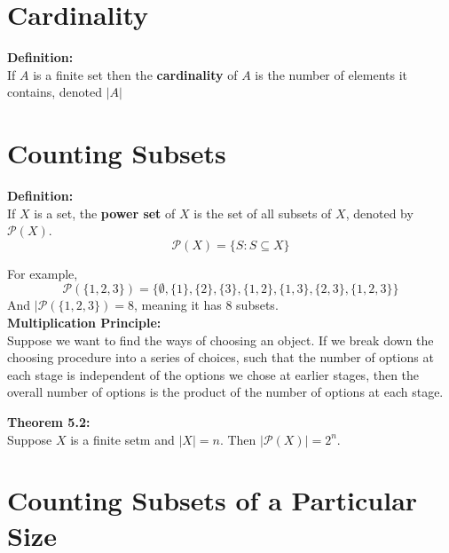 \documentclass{report}
\newenvironment{frameblue}[1][BlueViolet]
  {\begin{tcolorbox}[colframe=#1,colback=white]}
  {\end{tcolorbox}}
\newenvironment{framered}[1][Maroon]
  {\begin{tcolorbox}[colframe=#1,colback=white]}
  {\end{tcolorbox}}
\begin{document}
\section{Cardinality}

\begin{frameblue}
    \textbf{Definition:}\\
    If $A$ is a finite set then the \textbf{cardinality} of $A$ is the number of elements it contains, denoted $|A|$
\end{frameblue}

\section{Counting Subsets}

\begin{frameblue}
    \textbf{Definition:}\\
    If $X$ is a set, the \textbf{power set} of $X$ is the set of all subsets of $X$, denoted by $\mathcal{P}(X)$.
    \begin{equation*}
        \mathcal{P}(X) = \{ S : S \subseteq X \}
    \end{equation*}
\end{frameblue}

For example,
\begin{equation}
    \mathcal{P}(\{ 1,2,3\} ) = \{ \emptyset, \{ 1 \}, \{2 \}, \{3\}, \{1,2\}, \{1,3\}, \{2,3\}, \{1,2,3\} \}
\end{equation}
And $|\mathcal{P}(\{ 1,2,3\} ) = 8$, meaning it has 8 subsets.\\

\textbf{Multiplication Principle:}\\
Suppose we want to find the ways of choosing an object. If we break down the choosing procedure into a series of choices, such that the number of options at each stage is independent of the options we chose at earlier stages, then the overall number of options is the product of the number of options at each stage.

\begin{framered}
    \textbf{Theorem 5.2:}\\
    Suppose $X$ is a finite setm and $|X| = n$. Then $|\mathcal{P}(X)| = 2^n$.
\end{framered}

\section{Counting Subsets of a Particular Size}
\end{document}
